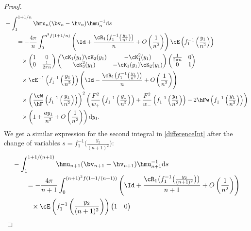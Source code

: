 \begin{proof}
\begin{align}
 &-\int_1^{1+1/n} \hmu_n(\bv_n-\hv_n)\hmu_n^{-1} {\rm d}s\nonumber
 \\
 &\qquad=- \frac{4\pi}{n} \int_0^{n^2f(1+1/n)} \left( \Id + \frac{\cR_1\big(f_1^{-1}\big(\frac{y_1}{n^2}\big)\big)}{n}+ O\left( \frac{1}{n^2} \right)\right)\cE\left(f_1^{-1}\left(\frac{y_1}{n^2}\right)\right)\nonumber
 \\
 &\phantom{\qquad=}{}\times
 \begin{pmatrix}
 1 & 0
 \\
 0 & \frac{1}{2\pi n}
 \end{pmatrix}
 \begin{pmatrix}
 \cK_1(y_1)\cK_2(y_1) & -\cK^2_1(y_1)
 \\
 \cK^2_2(y_1) & -\cK_1(y_1)\cK_2(y_1)
 \end{pmatrix}
 \begin{pmatrix}
 \frac{1}{2\pi n} & 0
 \\
 0 & 1
 \end{pmatrix}\nonumber
 \\
 &\phantom{\qquad=}{}\times
\cE^{-1}\left(f_1^{-1}\left(\frac{y_1}{n^2}\right)\right)\left( \Id - \frac{\cR_1\big(f_1^{-1}\big(\frac{y_1}{n^2}\big)\big)}{n}+ O\left( \frac{1}{n^2} \right)\right)\nonumber
 \\
 &\phantom{\qquad=}{}\times
 \left(\frac{\cW}{\hF}\left(f_1^{-1}\left(\frac{y_1}{n^2}\right)\right)\right)^2\left(\frac{F^2}{w_+}\left(f_1^{-1}\left(\frac{y_1}{n^2}\right)\right)+\frac{F^2}{w_-}\left(f_1^{-1}\left(\frac{y_1}{n^2}\right)\right)-2\hFw\left(f_1^{-1}\left(\frac{y_1}{n^2}\right)\right)\right)\nonumber
 \\
 &\phantom{\qquad=}{}\times \left(1 + \frac{ay_1}{n^2} + O\left(\frac{1}{n^2}\right)\right){\rm d}y_1.\label{LongExp1}
\end{align}
We get a similar expression for the second integral in \eqref{differenceInt} after the change of variables $s = f_1^{-1}\big(\frac{y_2}{(n+1)^2}\big)$:
\begin{align}
&-\int_1^{1+1/(n+1)} \hmu_{n+1}(\bv_{n+1}-\hv_{n+1})\hmu_{n+1}^{-1} {\rm d}s\nonumber
 \\
 &\qquad=- \frac{4\pi}{n+1} \int_0^{(n+1)^2f(1+1/(n+1))} \left( \Id + \frac{\cR_1\big(f_1^{-1}\big(\frac{y_2}{(n+1)^2}\big)\big)}{n+1}+ O\left( \frac{1}{n^2} \right)\right)\nonumber
 \\
 &\phantom{\qquad=}{}\times\cE\left(f_1^{-1}\left(\frac{y_2}{(n+1)^2}\right)\right)
 \begin{pmatrix}
 1 & 0
 \\

\end{pmatrix}
\end{align}
\end{proof}
